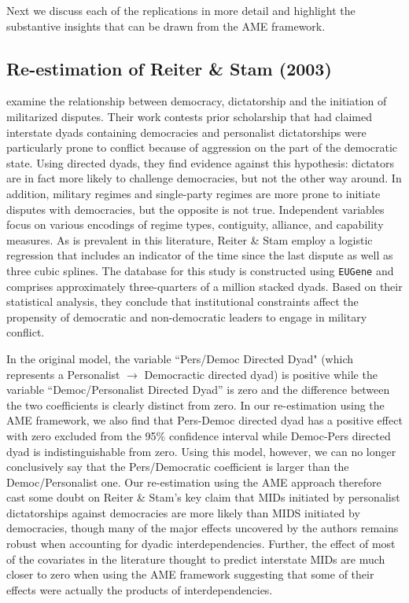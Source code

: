 Next we discuss each of the replications in more detail and highlight the substantive insights that can be drawn from the AME framework.

\subsection{Re-estimation of Reiter \& Stam (2003)}

\citet{reiter:stam:2003} examine the relationship between democracy, dictatorship and the initiation of militarized disputes. Their work contests prior scholarship that had claimed interstate dyads containing democracies and personalist dictatorships were particularly prone to conflict because of aggression on the part of the democratic state. Using directed dyads, they find evidence against this hypothesis: dictators are in fact more likely to challenge democracies, but not the other way around.  In addition, military regimes and single-party regimes are more prone to initiate disputes with democracies, but the opposite is not true. Independent variables focus on various encodings of regime types, contiguity, alliance, and capability measures. As is prevalent in this literature, Reiter \& Stam employ a logistic regression that includes an indicator of the time since the last dispute as well as three cubic splines. The database for this study is constructed using \texttt{EUGene} \citep{bennett:stam:2000} and comprises approximately three-quarters of a million stacked dyads. Based on their statistical analysis, they conclude that institutional constraints affect the propensity of democratic and non-democratic leaders to engage in military conflict. 

In the original model, the variable ``Pers/Democ Directed Dyad" (which represents a Personalist $\rightarrow$ Democractic directed dyad) is positive while the variable ``Democ/Personalist Directed Dyad'' is zero and the difference between the two coefficients is clearly distinct from zero. In our re-estimation using the AME framework, we also find that Pers-Democ directed dyad has a positive effect with zero excluded from the 95\% confidence interval while Democ-Pers directed dyad is indistinguishable from zero. Using this model, however, we can no longer conclusively say that the Pers/Democratic coefficient is larger than the Democ/Personalist one. Our re-estimation using the AME approach therefore cast some doubt on Reiter \& Stam's key claim that MIDs initiated by personalist dictatorships against democracies are more likely than MIDS initiated by democracies, though many of the major effects  uncovered by the authors remains robust when accounting for dyadic interdependencies. Further, the effect of most of the covariates in the literature thought to predict interstate MIDs are much closer to zero when using the AME framework suggesting that some of their effects were actually the products of interdependencies. 

